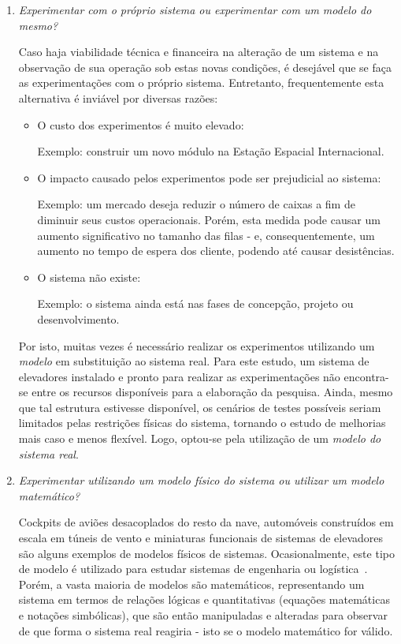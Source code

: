 \begin{enumerate}
\item \textit{Experimentar com o próprio sistema ou experimentar com um modelo do mesmo?}

Caso haja viabilidade técnica e financeira na alteração de um sistema e na
observação de sua operação sob estas novas condições, é desejável que se faça as
experimentações com o próprio sistema. Entretanto, frequentemente esta
alternativa é inviável por diversas razões:

\begin{itemize}
  \item O custo dos experimentos é muito elevado:

  Exemplo: construir um novo módulo na Estação Espacial Internacional.

  \item O impacto causado pelos experimentos pode ser prejudicial ao sistema:

  Exemplo: um mercado deseja reduzir o número de caixas a fim de diminuir seus
custos operacionais. Porém, esta medida pode causar um aumento significativo no
tamanho das filas - e, consequentemente, um aumento no tempo de espera dos
cliente, podendo até causar desistências.

  \item O sistema não existe:

  Exemplo: o sistema ainda está nas fases de concepção, projeto ou
desenvolvimento.

\end{itemize}

Por isto, muitas vezes é necessário realizar os experimentos utilizando um
\textit{modelo} em substituição ao sistema real. Para este estudo, um sistema de
elevadores instalado e pronto para realizar as experimentações não encontra-se
entre os recursos disponíveis para a elaboração da pesquisa. Ainda, mesmo que
tal estrutura estivesse disponível, os cenários de testes possíveis seriam
limitados pelas restrições físicas do sistema, tornando o estudo de melhorias
mais caso e menos flexível. Logo, optou-se pela utilização de um \textit{modelo do
sistema real}.

\item \textit{Experimentar utilizando um modelo físico do sistema ou utilizar um modelo
matemático?}

Cockpits de aviões desacoplados do resto da nave, automóveis construídos em
escala em túneis de vento e miniaturas funcionais de sistemas de elevadores são
alguns exemplos de modelos físicos de sistemas. Ocasionalmente, este tipo de
modelo é utilizado para estudar sistemas de engenharia ou logística~\cite{Law}.
Porém, a vasta maioria de modelos são matemáticos, representando um sistema em
termos de relações lógicas e quantitativas (equações matemáticas e notações
simbólicas), que são então manipuladas e alteradas para observar de que forma o
sistema real reagiria - isto se o modelo matemático for válido.


\end{enumerate}
